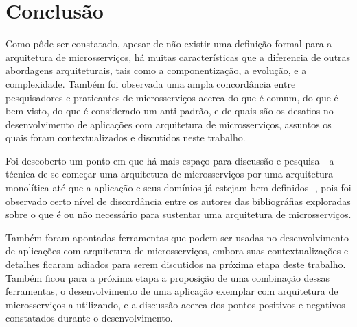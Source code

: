 \chapter{Conclusão}\label{chapter-conclusao}

Como pôde ser constatado, apesar de não existir uma definição formal para a arquitetura de microsserviços, há muitas características que a diferencia de outras abordagens arquiteturais, tais como a componentização, a evolução, e a complexidade. Também foi observada uma ampla concordância entre pesquisadores e praticantes de microsserviços acerca do que é comum, do que é bem-visto, do que é considerado um anti-padrão, e de quais são os desafios no desenvolvimento de aplicações com arquitetura de microsserviços, assuntos os quais foram contextualizados e discutidos neste trabalho. 

Foi descoberto um ponto em que há mais espaço para discussão e pesquisa - a técnica de se começar uma arquitetura de microsserviços por uma arquitetura monolítica até que a aplicação e seus domínios já estejam bem definidos -, pois foi observado certo nível de discordância entre os autores das bibliográfias exploradas sobre o que é ou não necessário para sustentar uma arquitetura de microsserviços.

Também foram apontadas ferramentas que podem ser usadas no desenvolvimento de aplicações com arquitetura de microsserviços, embora suas contextualizações e detalhes ficaram adiados para serem discutidos na próxima etapa deste trabalho. Também ficou para a próxima etapa a proposição de uma combinação dessas ferramentas, o desenvolvimento de uma aplicação exemplar com arquitetura de microsserviços a utilizando, e a discussão acerca dos pontos positivos e negativos constatados durante o desenvolvimento.


